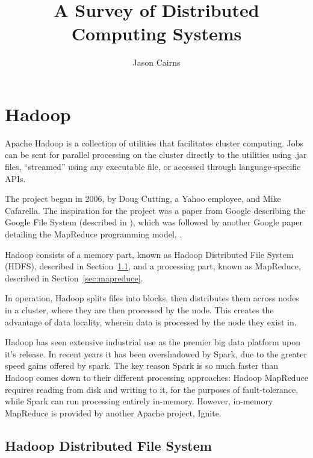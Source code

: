 \documentclass[10pt,a4paper]{article}
\begin{document}
\title{A Survey of Distributed Computing Systems}
\author{Jason Cairns}
  
\maketitle{}
\tableofcontents{}

\section{Hadoop}
\label{sec:hadoop-1}

Apache Hadoop is a collection of utilities that facilitates cluster
computing. Jobs can be sent for parallel processing on the cluster
directly to the utilities using .jar files, ``streamed'' using any
executable file, or accessed through language-specific APIs.

The project began in 2006, by Doug Cutting, a Yahoo employee, and Mike
Cafarella. The inspiration for the project was a paper from Google
describing the Google File System (described in
\textcite{ghemawat2003google}), which was followed by another Google
paper detailing the MapReduce programming model,
\textcite{dean2004mapreduce}.

Hadoop consists of a memory part, known as Hadoop Distributed File
System (HDFS), described in Section~\ref{sec:hdfs}, and a processing part,
known as MapReduce, described in Section~\ref{sec:mapreduce}.

In operation, Hadoop splits files into blocks, then distributes them
across nodes in a cluster, where they are then processed by the node.
This creates the advantage of data locality, wherein data is processed
by the node they exist in.

Hadoop has seen extensive industrial use as the premier big data
platform upon it's release. In recent years it has been overshadowed
by Spark, due to the greater speed gains offered by spark. The key
reason Spark is so much faster than Hadoop comes down to their
different processing approaches: Hadoop MapReduce requires reading
from disk and writing to it, for the purposes of fault-tolerance,
while Spark can run processing entirely in-memory. However, in-memory
MapReduce is provided by another Apache project,
Ignite\cite{zheludkov2017high}.


\subsection{Hadoop Distributed File System}
\label{sec:hdfs}
\end{document}
